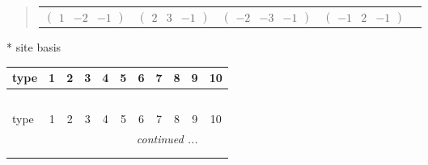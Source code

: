 \documentclass[fleqn,9pt,landscape]{jsarticle}
\begin{document}
\begin{quote}
\begin{tabular}{ccccc}
$ \begin{pmatrix} 1 & -2 & -1 \end{pmatrix} $ & $ \begin{pmatrix} 2 & 3 & -1 \end{pmatrix} $ & $ \begin{pmatrix} -2 & -3 & -1 \end{pmatrix} $ & $ \begin{pmatrix} -1 & 2 & -1 \end{pmatrix} $ & $  $
\end{tabular}
\end{quote}
* site basis
\begin{center}
\renewcommand{\arraystretch}{1.3}
\begin{longtable}{lcccccccccc}
 \hline \hline
type & 1 & 2 & 3 & 4 & 5 & 6 & 7 & 8 & 9 & 10 \\ \hline \endfirsthead

\multicolumn{10}{l}{\tablename\ \thetable{}} \\
 \hline \hline
type & 1 & 2 & 3 & 4 & 5 & 6 & 7 & 8 & 9 & 10 \\ \hline \endhead

 \hline \hline
\multicolumn{10}{r}{\footnotesize\it continued ...} \\ \endfoot

 \hline \hline
\multicolumn{10}{r}{} \\ \endlastfoot


\end{longtable}
\end{center}
\end{document}

